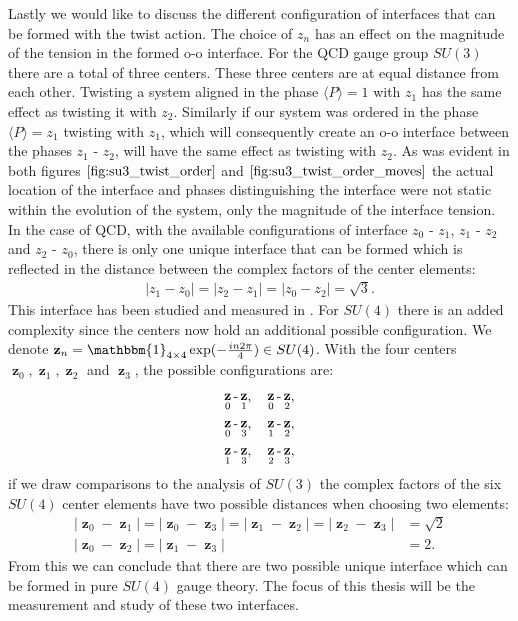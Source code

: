 \documentclass[english,twoside,openright]{UH_TCM_MSc}
\DeclareMathOperator{\z}{\mathbf{z}}
\newcommand{\id}{\mathbbm{1}}
\begin{document}
Lastly we would like to discuss the different configuration of interfaces that can be formed with the twist action. The choice of $z_n$ has an effect on the magnitude of the tension in the formed o-o interface. For the QCD gauge group $SU(3)$ there are a total of three centers. These three centers are at equal distance from each other. Twisting a system aligned in the phase $\langle P \rangle = 1$ with $z_1$ has the same effect as twisting it with $z_2$. Similarly if our system was ordered in the phase  $\langle P \rangle = z_1$ twisting with $z_1$, which will consequently create an o-o interface between the phases $z_1$ - $z_2$, will have the same effect as twisting with $z_2$. As was evident in both figures $\ref{fig:su3_twist_order}$ and $\ref{fig:su3_twist_order_moves}$ the actual location of the interface and phases distinguishing the interface were not static within the evolution of the system, only the magnitude of the interface tension. In the case of QCD, with the available configurations of interface $z_0$ - $z_1$, $z_1$ - $z_2$ and $z_2$ - $z_0$, there is only one unique interface that can be formed which is reflected in the distance between the complex factors of the center elements:
\begin{align}
    |z_1 - z_0| = |z_2 - z_1| = |z_0 - z_2| = \sqrt{3}.
\end{align}
This interface has been studied and measured in \cite{twist}. For $SU(4)$ there is an added complexity since the centers now hold an additional possible configuration. We denote $\mathbf{z}_n = \id_{4\times 4} \exp(-\frac{in2\pi}{4}) \in SU(4)$. With the four centers $\z_0,\z_1,\z_2$ and $\z_3$, the possible configurations are:
\begin{align*}
    \z_0 \text{-} \z_1, \hspace{10px} \z_0 \text{-} \z_2, \\
    \z_0 \text{-} \z_3, \hspace{10px} \z_1 \text{-} \z_2, \\
    \z_1 \text{-} \z_3, \hspace{10px} \z_2 \text{-} \z_3,
\end{align*}
if we draw comparisons to the analysis of $SU(3)$ the complex factors of the six $SU(4)$ center elements have two possible distances when choosing two elements:
\begin{align}
    |\z_0 - \z_1| = |\z_0 - \z_3| =  |\z_1 - \z_2| = |\z_2 - \z_3| &= \sqrt{2} \\
    |\z_0 - \z_2| = |\z_1 - \z_3| &= 2.
\end{align}
From this we can conclude that there are two possible unique interface which can be formed in pure $SU(4)$ gauge theory. The focus of this thesis will be the measurement and study of these two interfaces.
\end{document}

